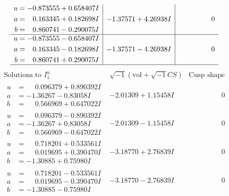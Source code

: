\documentclass[1p]{elsarticle_modified}
\theoremstyle{definition}
\newcommand{\I}{\sqrt{-1}}
\begin{document}
$$\begin{array}{c|c|c}
\begin{aligned}
u &= -0.873555 + 0.658407 I \\
a &= \phantom{-}0.163345 + 0.182698 I \\
b &= \phantom{-}0.860741 - 0.290075 I\end{aligned}
 & -1.37571 + 4.26938 I & \phantom{-0.000000 } 0 \\ \hline\begin{aligned}
u &= -0.873555 - 0.658407 I \\
a &= \phantom{-}0.163345 - 0.182698 I \\
b &= \phantom{-}0.860741 + 0.290075 I\end{aligned}
 & -1.37571 - 4.26938 I & \phantom{-0.000000 } 0\\
 \hline 
 \end{array}$$\newpage$$\begin{array}{c|c|c}  
\text{Solutions to }I^u_{1}& \I (\text{vol} + \sqrt{-1}CS) & \text{Cusp shape}\\
 \hline 
\begin{aligned}
u &= \phantom{-}0.096379 + 0.890392 I \\
a &= -1.36267 - 0.83058 I \\
b &= \phantom{-}0.566969 + 0.647022 I\end{aligned}
 & -2.01309 + 1.15458 I & \phantom{-0.000000 } 0 \\ \hline\begin{aligned}
u &= \phantom{-}0.096379 - 0.890392 I \\
a &= -1.36267 + 0.83058 I \\
b &= \phantom{-}0.566969 - 0.647022 I\end{aligned}
 & -2.01309 - 1.15458 I & \phantom{-0.000000 } 0 \\ \hline\begin{aligned}
u &= \phantom{-}0.718201 + 0.533561 I \\
a &= \phantom{-}0.019695 + 0.390470 I \\
b &= -1.30885 + 0.75980 I\end{aligned}
 & -3.18770 + 2.76839 I & \phantom{-0.000000 } 0 \\ \hline\begin{aligned}
u &= \phantom{-}0.718201 - 0.533561 I \\
a &= \phantom{-}0.019695 - 0.390470 I \\
b &= -1.30885 - 0.75980 I\end{aligned}
 & -3.18770 - 2.76839 I & \phantom{-0.000000 } 0 \\ \hline\begin{aligned}

\end{aligned}
\end{array}$$
\end{document}
